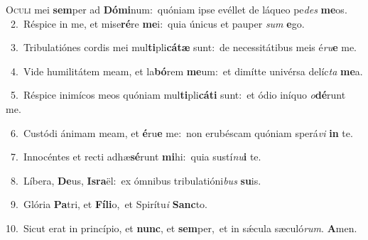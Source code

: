 \lettrine{\initial\textcolor{\initialcolor}{O}}{culi} mei \textbf{sem}\-per ad \textbf{Dó}\-\textbf{mi}num:~\star quóniam ipse evéllet de láqueo pe\textit{des} \textbf{me}\-os.\\
{\numbfont\textcolor{\numbcolor}{~2.}}~Réspice in me, et mise\-\textbf{ré}\-re \textbf{me}\-i:~\star quia únicus et pauper \textit{sum} \textbf{e}\-go.\par
{\numbfont\textcolor{\numbcolor}{~3.}}~Tribulatiónes cordis mei mul\-\textbf{ti}\-pli\-\textbf{cá}\-\textbf{tæ} sunt:~\star de necessitátibus meis é\-\textit{ru}\-\textbf{e} me.\par
{\numbfont\textcolor{\numbcolor}{~4.}}~Vide humilitátem meam, et la\-\textbf{bó}\-rem \textbf{me}\-um:~\star et dimítte univérsa delíc\textit{ta} \textbf{me}\-a.\par
{\numbfont\textcolor{\numbcolor}{~5.}}~Réspice inimícos meos quóniam mul\-\textbf{ti}\-pli\-\textbf{cá}\-\textbf{ti} sunt:~\star et ódio iníquo \textit{o}\-\textbf{dé}runt me.\par
{\numbfont\textcolor{\numbcolor}{~6.}}~Custódi ánimam meam, et \textbf{é}\-ru\textbf{e} me:~\star non erubéscam quóniam sperá\textit{vi} \textbf{in} te.\par
{\numbfont\textcolor{\numbcolor}{~7.}}~Innocéntes et recti adhæ\-\textbf{sé}\-runt \textbf{mi}\-hi:~\star quia sustí\-\textit{nu}\-\textbf{i} te.\par
{\numbfont\textcolor{\numbcolor}{~8.}}~Líbera, \textbf{De}\-us, \textbf{Is}\-\textbf{ra}ël:~\star ex ómnibus tribulatióni\textit{bus} \textbf{su}\-is.\par
{\numbfont\textcolor{\numbcolor}{~9.}}~Glória \textbf{Pa}\-tri, et \textbf{Fí}\-\textbf{li}o,~\star et Spirítu\textit{i} \textbf{Sanc}\-to.\par
{\numbfont\textcolor{\numbcolor}{10.}}~Sicut erat in princípio, et \textbf{nunc}\-, et \textbf{sem}\-per,~\star et in sǽcula sæculó\-\textit{rum}\-. \textbf{A}\-men.\par
